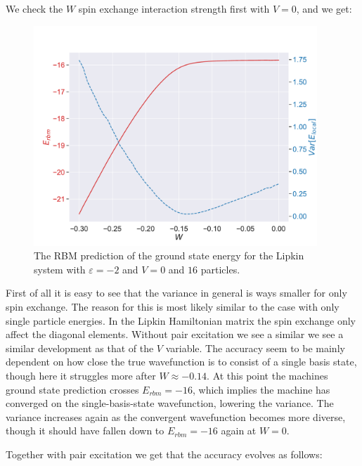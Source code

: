We check the $W$ spin exchange interaction strength first with $V=0$, and we get:
\begin{figure}[H]
  \begin{center}
    \includegraphics[width=0.95\textwidth]{Figures/Plots/Lipkin/[W][-0.3-0.0][e=850][n=16][eps=-2][V=0].pdf}
  \end{center}
  \caption{The RBM prediction of the ground state energy for the Lipkin system with $\varepsilon=-2$ and $V=0$ and $16$ particles.}
\end{figure}

First of all it is easy to see that the variance in general is ways smaller for only spin exchange. The reason for this is most likely similar to the case with only single particle energies. In the Lipkin Hamiltonian matrix the spin exchange only affect the diagonal elements. Without pair excitation we see a similar we see a similar development as that of the $V$ variable. The accuracy seem to be mainly dependent on how close the true wavefunction is to consist of a single basis state, though here it struggles more after $W \approx -0.14$. At this point the machines ground state prediction crosses $E_{rbm} = -16$, which implies the machine has converged on the single-basis-state wavefunction, lowering the variance. The variance increases again as the convergent wavefunction becomes more diverse, though it should have fallen down to $E_{rbm} = -16$ again at $W=0$.

Together with pair excitation we get that the accuracy evolves as follows:

